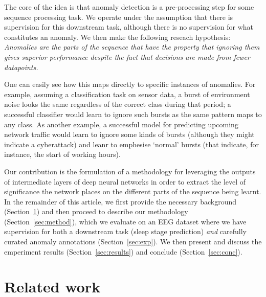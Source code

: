 \documentclass[conference]{IEEEtran}
\begin{document}
The core of the idea is that anomaly detection is a pre-processing
step for some sequence processing task. We operate under the
assumption that there is supervision for this downstream task,
although there is no supervision for what constitutes an anomaly.
We then make the following reseach hypothesis:
\emph{Anomalies are the parts of the sequence that have the property
that ignoring them gives superior performance despite the fact that
decisions are made from fewer datapoints.}

One can easily see how this maps directly to specific instances of
anomalies. For example, assuming a classification task on sensor data,
a burst of environment noise looks the same regardless of the correct
class during that period; a successful classifier would learn to
ignore such bursts as the same pattern maps to any class. As another
example, a successful model for predicting upcoming network traffic
would learn to ignore some kinds of bursts (although they might
indicate a cyberattack) and leanr to emphesise `normal' bursts
(that indicate, for instance, the start of working hours).

Our contribution is the formulation of a methodology for leveraging
the outputs of intermediate layers of deep neural networks in order
to extract the level of significance the network places on the
different parts of the sequence being learnt. In the remainder of
this article, we first provide the necessary background
(Section~\ref{sec:bg}) and then proceed to describe our
methodology (Section~\ref{sec:method}), which we evaluate on
an EEG dataset where we have supervision for both a downstream task
(sleep stage prediction) \emph{and} carefully curated anomaly
annotations (Section~\ref{sec:exp}). We then present and discuss
the emperiment results (Section~\ref{sec:results}) and conclude
(Section~\ref{sec:conc}).



\section{Related work}
\label{sec:bg}
\end{document}
